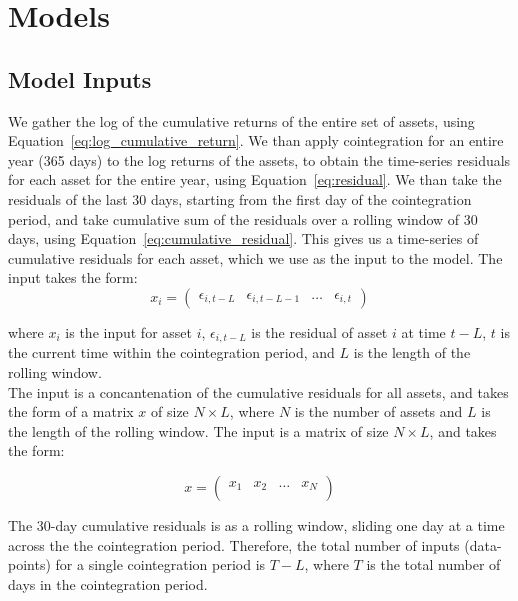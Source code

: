 \documentclass[12pt]{article}
\begin{document}
\section{Models}

\subsection*{Model Inputs}

We gather the log of the cumulative returns of the entire set of assets, using Equation~\ref{eq:log_cumulative_return}. We than apply cointegration for an entire year (365 days) to the log returns of the assets, to obtain the time-series residuals for each asset for the entire year, using Equation~\ref{eq:residual}. We than take the residuals of the last 30 days, starting from the first day of the cointegration period, and take cumulative sum of the residuals over a rolling window of 30 days, using Equation~\ref{eq:cumulative_residual}. This gives us a time-series of cumulative residuals for each asset, which we use as the input to the model. The input takes the form:
\begin{equation}
    x_i = \begin{pmatrix}
        \epsilon_{i,t-L} & \epsilon_{i,t-L-1} & \ldots & \epsilon_{i,t}
    \end{pmatrix}
    \label{eq:input_single_asset}
\end{equation}

where $x_i$ is the input for asset $i$, $\epsilon_{i,t-L}$ is the residual of asset $i$ at time $t-L$, $t$ is the current time within the cointegration period, and $L$ is the length of the rolling window. 
\\
The input is a concantenation of the cumulative residuals for all assets, and takes the form of a matrix $x$ of size $N \times L$, where $N$ is the number of assets and $L$ is the length of the rolling window. The input is a matrix of size $N \times L$, and takes the form:

\begin{equation}
    x = \begin{pmatrix}
        x_1 & x_2 & \ldots & x_N \\
    \end{pmatrix}
    \label{eq:input_matrix}
\end{equation}

The 30-day cumulative residuals is as a rolling window, sliding one day at a time across the the cointegration period. Therefore, the total number of inputs (data-points) for a single cointegration period is $T - L$, where $T$ is the total number of days in the cointegration period.
\end{document}
